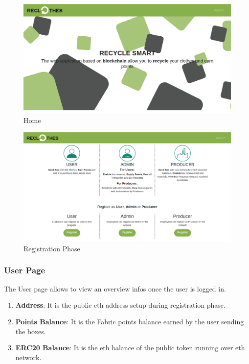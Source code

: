 \begin{figure}[h!]
    \centering
    \includegraphics[totalheight=7.5cm]{img/dapp/home1.png}
    \caption{Home}
    \label{fig:home}
\end{figure}

\begin{figure}[h!]
    \centering
    \includegraphics[totalheight=7.5cm]{img/dapp/home2.png}
    \caption{Registration Phase}
    \label{fig:registration}
\end{figure}

\newpage
\subsubsection{User Page}

The User page allows to view an overview infos once the user is logged in. 

\begin{enumerate}[-]
    \item \textbf{Address}: It is the public eth address setup during registration phase. 
    \item \textbf{Points Balance}: It is the Fabric points balance earned by the user sending the boxes.
    \item \textbf{ERC20 Balance}: It is the eth balance of the public token running over eth network.
\end{enumerate}

